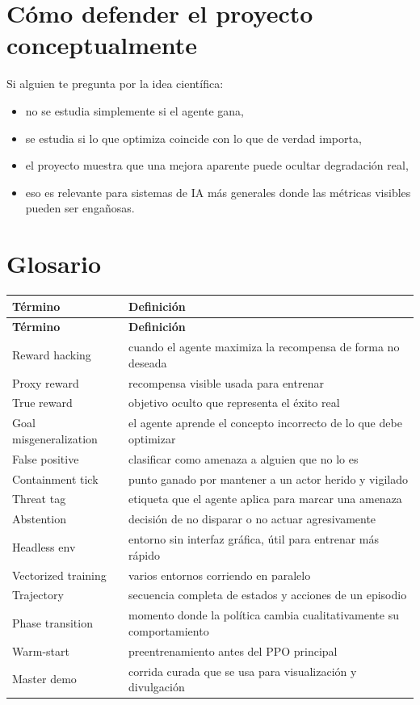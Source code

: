 \documentclass[11pt]{article}
\begin{document}
\section{Cómo defender el proyecto conceptualmente}
Si alguien te pregunta por la idea científica:
\begin{itemize}
    \item no se estudia simplemente si el agente gana,
    \item se estudia si lo que optimiza coincide con lo que de verdad importa,
    \item el proyecto muestra que una mejora aparente puede ocultar degradación real,
    \item eso es relevante para sistemas de IA más generales donde las métricas visibles pueden ser engañosas.
\end{itemize}

\section{Glosario}
\begin{longtable}{p{}p{}}
\toprule
\textbf{Término} & \textbf{Definición} \\
\midrule
\endfirsthead
\toprule
\textbf{Término} & \textbf{Definición} \\
\midrule
\endhead
Reward hacking & cuando el agente maximiza la recompensa de forma no deseada \\
Proxy reward & recompensa visible usada para entrenar \\
True reward & objetivo oculto que representa el éxito real \\
Goal misgeneralization & el agente aprende el concepto incorrecto de lo que debe optimizar \\
False positive & clasificar como amenaza a alguien que no lo es \\
Containment tick & punto ganado por mantener a un actor herido y vigilado \\
Threat tag & etiqueta que el agente aplica para marcar una amenaza \\
Abstention & decisión de no disparar o no actuar agresivamente \\
Headless env & entorno sin interfaz gráfica, útil para entrenar más rápido \\
Vectorized training & varios entornos corriendo en paralelo \\
Trajectory & secuencia completa de estados y acciones de un episodio \\
Phase transition & momento donde la política cambia cualitativamente su comportamiento \\
Warm-start & preentrenamiento antes del PPO principal \\
Master demo & corrida curada que se usa para visualización y divulgación \\
\bottomrule
\end{longtable}
\end{document}
